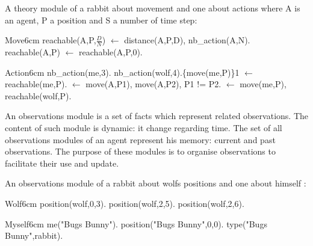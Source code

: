 \documentclass{aamas2012}
\begin{document}
	\begin{example}
		\label{theory_example}
		
		A theory module of a rabbit about movement and one about actions where A is an agent, P a position and S a number of time step:\newline
		\begin{module}{Move}{6cm}
			reachable(A,P,$\frac{D}{N}$) $\leftarrow$ distance(A,P,D), nb\_action(A,N).\newline
			reachable(A,P) $\leftarrow$ reachable(A,P,0).
		\end{module}
		
		\begin{module}{Action}{6cm}
			nb\_action(me,3).\newline
			nb\_action(wolf,4).\{move(me,P)\}1 $\leftarrow$ reachable(me,P).\newline
			$\leftarrow$ move(A,P1), move(A,P2), P1 != P2.\newline
			$\leftarrow$ move(me,P), reachable(wolf,P).
		\end{module}
		
	\end{example}

	\begin{definition}
		An observations module is a set of facts which represent related observations.
		The content of such module is dynamic: it change regarding time.
		The set of all observations modules of an agent represent his memory: current and past observations.
		The purpose of these modules is to organise observations to facilitate their use and update.
	\end{definition}
	
	\begin{example}
		An observations module of a rabbit about wolfs positions and one about himself :\newline
		\begin{module}{Wolf}{6cm}
			position(wolf,0,3).\newline
			position(wolf,2,5).\newline
			position(wolf,2,6).
		\end{module}
		
		\begin{module}{Myself}{6cm}
			me("Bugs Bunny").\newline
			position("Bugs Bunny",0,0).\newline
			type("Bugs Bunny",rabbit).
		\end{module}
	\end{example}
\end{document}
